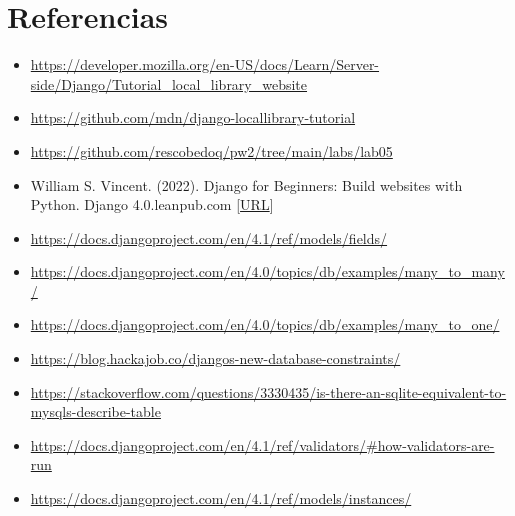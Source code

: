 \documentclass{article}
\begin{document}
    \section{Referencias}
        \begin{itemize}
            \item \url{https://developer.mozilla.org/en-US/docs/Learn/Server-side/Django/Tutorial_local_library_website}
            \item \url{https://github.com/mdn/django-locallibrary-tutorial}
            \item \url{https://github.com/rescobedoq/pw2/tree/main/labs/lab05}
            \item William S. Vincent. (2022). Django for Beginners: Build websites with Python. Django 4.0.leanpub.com [\href{http://library.lol/main/22AF742D96697DE55EF5F88B08F1AA86}{URL}]
            \item \url{https://docs.djangoproject.com/en/4.1/ref/models/fields/}
            \item \url{https://docs.djangoproject.com/en/4.0/topics/db/examples/many_to_many/}
            \item \url{https://docs.djangoproject.com/en/4.0/topics/db/examples/many_to_one/}
            \item \url{https://blog.hackajob.co/djangos-new-database-constraints/}
            \item \url{https://stackoverflow.com/questions/3330435/is-there-an-sqlite-equivalent-to-mysqls-describe-table}
            \item \url{https://docs.djangoproject.com/en/4.1/ref/validators/#how-validators-are-run}
            \item \url{https://docs.djangoproject.com/en/4.1/ref/models/instances/}
        \end{itemize}
\end{document}
